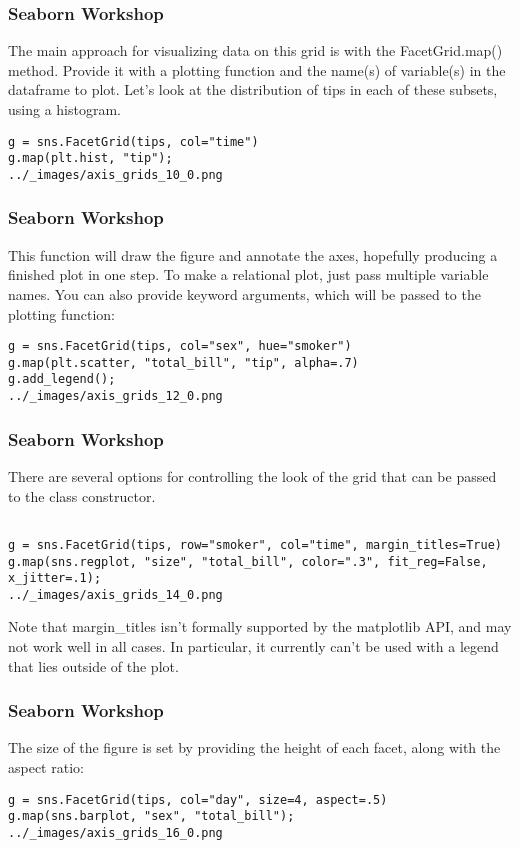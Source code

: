 \begin{frame}[fragile]
\frametitle{Seaborn Workshop}
\large

The main approach for visualizing data on this grid is with the FacetGrid.map() method. Provide it with a plotting function and the name(s) of variable(s) in the dataframe to plot. Let’s look at the distribution of tips in each of these subsets, using a histogram.

\begin{verbatim}
g = sns.FacetGrid(tips, col="time")
g.map(plt.hist, "tip");
../_images/axis_grids_10_0.png
\end{verbatim}
\end{frame}
\begin{frame}[fragile]
\frametitle{Seaborn Workshop}
\large
This function will draw the figure and annotate the axes, hopefully producing a finished plot in one step. To make a relational plot, just pass multiple variable names. You can also provide keyword arguments, which will be passed to the plotting function:
\begin{verbatim}
g = sns.FacetGrid(tips, col="sex", hue="smoker")
g.map(plt.scatter, "total_bill", "tip", alpha=.7)
g.add_legend();
../_images/axis_grids_12_0.png
\end{verbatim}
\end{frame}
\begin{frame}[fragile]
\frametitle{Seaborn Workshop}
\large

There are several options for controlling the look of the grid that can be passed to the class constructor.

\begin{verbatim}

g = sns.FacetGrid(tips, row="smoker", col="time", margin_titles=True)
g.map(sns.regplot, "size", "total_bill", color=".3", fit_reg=False, x_jitter=.1);
../_images/axis_grids_14_0.png
\end{verbatim}
Note that margin\_titles isn’t formally supported by the matplotlib API, and may not work well in all cases. In particular, it currently can’t be used with a legend that lies outside of the plot.
\end{frame}
\begin{frame}[fragile]
\frametitle{Seaborn Workshop}
\large
The size of the figure is set by providing the height of each facet, along with the aspect ratio:
\begin{verbatim}
g = sns.FacetGrid(tips, col="day", size=4, aspect=.5)
g.map(sns.barplot, "sex", "total_bill");
../_images/axis_grids_16_0.png
\end{verbatim}
\end{frame}
